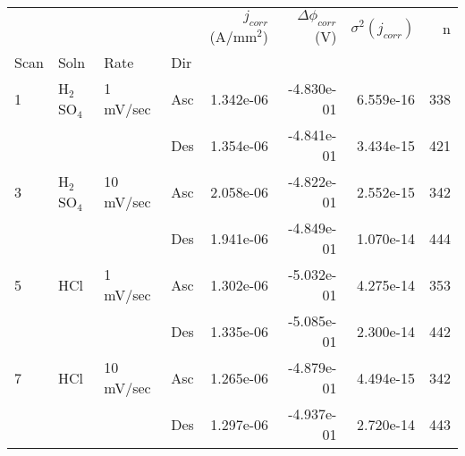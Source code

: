 \begin{tabular}{llllrrrr}
\toprule
  &     &           &     &  $j_{corr}$ (A/mm$^2$) &  $\Delta \phi_{corr}$ (V) &  $\sigma^2(j_{corr})$ &    n \\
Scan & Soln & Rate & Dir &                        &                           &                       &      \\
\midrule
1 & H$_2$SO$_4$ & 1 mV/sec & Asc &              1.342e-06 &                -4.830e-01 &             6.559e-16 &  338 \\
  &     &           & Des &              1.354e-06 &                -4.841e-01 &             3.434e-15 &  421 \\
3 & H$_2$SO$_4$ & 10 mV/sec & Asc &              2.058e-06 &                -4.822e-01 &             2.552e-15 &  342 \\
  &     &           & Des &              1.941e-06 &                -4.849e-01 &             1.070e-14 &  444 \\
5 & HCl & 1 mV/sec & Asc &              1.302e-06 &                -5.032e-01 &             4.275e-14 &  353 \\
  &     &           & Des &              1.335e-06 &                -5.085e-01 &             2.300e-14 &  442 \\
7 & HCl & 10 mV/sec & Asc &              1.265e-06 &                -4.879e-01 &             4.494e-15 &  342 \\
  &     &           & Des &              1.297e-06 &                -4.937e-01 &             2.720e-14 &  443 \\
\bottomrule
\end{tabular}
